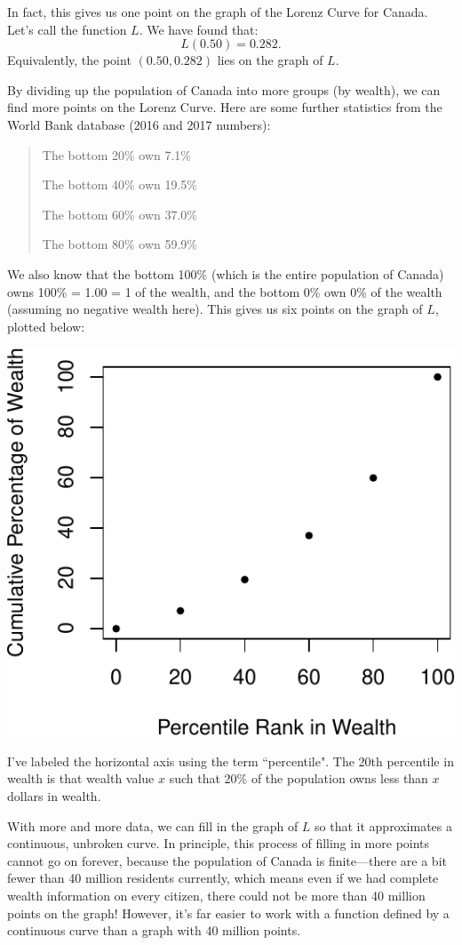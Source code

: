 \documentclass[12pt]{memoir}\usepackage[]{graphicx}\usepackage[table]{xcolor}
\begin{document}
In fact, this gives us one point on the graph of the Lorenz Curve for Canada.  
Let's call the function $L$.  We have found that: 
$$L(0.50) = 0.282.$$
Equivalently, the point $(0.50, 0.282)$ lies on the graph of $L$. 

By dividing up the population of Canada into more groups (by wealth), we can find
more points on the Lorenz Curve.  Here are some further statistics from the World
Bank database (2016 and 2017 numbers):
\begin{quote}
The bottom 20\% own 7.1\% 

The bottom 40\% own 19.5\%

The bottom 60\% own 37.0\%

The bottom 80\% own 59.9\%
\end{quote}
We also know that the bottom 100\% (which is the entire population of Canada) owns
100\% = 1.00 = 1 of the wealth, and the bottom 0\% own 0\% of the wealth
(assuming no negative wealth here). This gives us six points on the graph of $L$, plotted below: 

\begin{center}
\includegraphics{figure/Lorenz1-1.pdf}
\end{center}
I've labeled the horizontal axis using the term ``percentile".  The 20th 
percentile in wealth is that wealth value $x$ such that 20\% of the population
owns less than $x$ dollars in wealth. 

With more and more data, we can fill in the graph of $L$ so that it approximates
a continuous, unbroken curve.  In principle, this process of filling in more points
cannot go on forever, because the population of Canada is finite---there are a bit 
fewer than 40 million residents currently, which means even if we had complete wealth 
information on every citizen, there could not be more than 40 million points on the
graph!  However, it's far easier to work with a function defined by a continuous curve than
a graph with 40 million points.  
\end{document}
